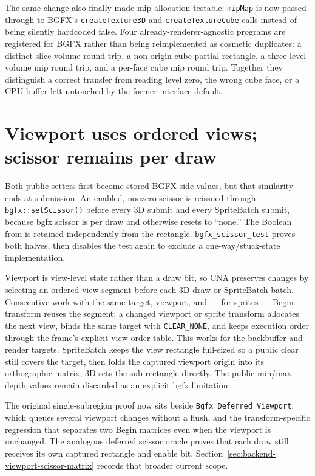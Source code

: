 The same change also finally made mip allocation testable: \texttt{mipMap} is now passed through
to BGFX's \texttt{createTexture3D} and \texttt{createTextureCube} calls instead of being silently
hardcoded false. Four already-renderer-agnostic programs are registered for BGFX rather than being
reimplemented as cosmetic duplicates: a distinct-slice volume round trip, a non-origin cube
partial rectangle, a three-level volume mip round trip, and a per-face cube mip round trip.
Together they distinguish a correct transfer from reading level zero, the wrong cube face, or a
CPU buffer left untouched by the former interface default.

\section{Viewport uses ordered views; scissor remains per draw}

Both public setters first become stored BGFX-side values, but that similarity ends at
submission. An enabled, nonzero scissor is reissued through \texttt{bgfx::setScissor()} before
every 3D submit and every SpriteBatch submit, because bgfx scissor is per draw and otherwise
resets to ``none.'' The Boolean from  is retained independently from
the rectangle. \texttt{bgfx\_scissor\_test} proves both halves, then disables the test again to
exclude a one-way/stuck-state implementation.

Viewport is view-level state rather than a draw bit, so CNA preserves changes by selecting an
ordered view segment before each 3D draw or SpriteBatch batch. Consecutive work with the same
target, viewport, and --- for sprites --- Begin transform reuses the segment; a changed viewport
or sprite transform allocates the next view, binds the same target with \texttt{CLEAR\_NONE},
and keeps execution order through the frame's explicit view-order table. This works for the
backbuffer and render targets. SpriteBatch keeps the view rectangle full-sized so a public
clear still covers the target, then folds the captured viewport origin into its orthographic
matrix; 3D sets the sub-rectangle directly. The public min/max depth values remain discarded as
an explicit bgfx limitation.

The original single-subregion proof now sits beside \texttt{Bgfx\_Deferred\_Viewport}, which
queues several viewport changes without a flush, and the transform-specific regression that
separates two Begin matrices even when the viewport is unchanged. The analogous deferred
scissor oracle proves that each draw still receives its own captured rectangle and enable bit.
Section~\ref{sec:backend-viewport-scissor-matrix} records that broader current scope.

